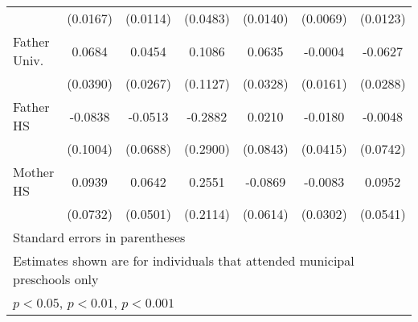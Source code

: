 \begin{table}[htbp]
\begin{tabular}{l*{6}{c}}
            &    (0.0167)         &    (0.0114)         &    (0.0483)         &    (0.0140)         &    (0.0069)         &    (0.0123)         \\
\addlinespace
Father Univ.&      0.0684         &      0.0454         &      0.1086         &      0.0635         &     -0.0004         &     -0.0627\sym{*}  \\
            &    (0.0390)         &    (0.0267)         &    (0.1127)         &    (0.0328)         &    (0.0161)         &    (0.0288)         \\
\addlinespace
Father HS   &     -0.0838         &     -0.0513         &     -0.2882         &      0.0210         &     -0.0180         &     -0.0048         \\
            &    (0.1004)         &    (0.0688)         &    (0.2900)         &    (0.0843)         &    (0.0415)         &    (0.0742)         \\
\addlinespace
Mother HS   &      0.0939         &      0.0642         &      0.2551         &     -0.0869         &     -0.0083         &      0.0952         \\
            &    (0.0732)         &    (0.0501)         &    (0.2114)         &    (0.0614)         &    (0.0302)         &    (0.0541)         \\
\bottomrule
\multicolumn{7}{l}{\footnotesize Standard errors in parentheses}\\
\multicolumn{7}{l}{\footnotesize Estimates shown are for individuals that attended municipal preschools only}\\
\multicolumn{7}{l}{\footnotesize \sym{*} \(p<0.05\), \sym{**} \(p<0.01\), \sym{***} \(p<0.001\)}\\
\end{tabular}
\end{table}

